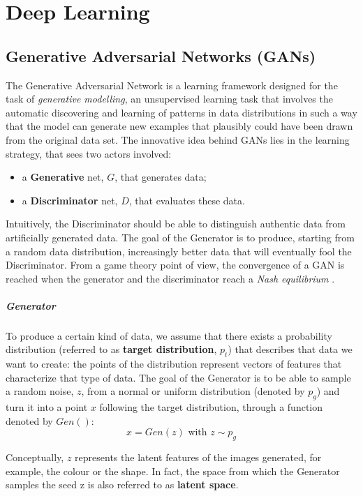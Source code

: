 \documentclass[12pt,a4paper]{book}
\theoremstyle{definition}
\begin{document}
	\chapter{Deep Learning}\label{appendix:dl}
	\section{Generative Adversarial Networks (GANs)}
	The Generative Adversarial Network \cite{Goodfellow2014} is a learning framework designed for the task of \textit{generative modelling}, an unsupervised learning task that involves the automatic discovering and learning of patterns in data distributions in such a way that the model can generate new examples that plausibly could have been drawn from the original data set. The innovative idea behind GANs lies in the learning strategy, that sees two actors involved:
	\begin{itemize}
		\item a \textbf{Generative} net, $G$, that generates data;
		\item a \textbf{Discriminator} net, $D$, that evaluates these data.
	\end{itemize}
	Intuitively, the Discriminator should be able to distinguish authentic data from artificially generated data. The goal of the Generator is to produce, starting from a random data distribution, increasingly better data that will eventually fool the Discriminator. From a game theory point of view, the convergence of a GAN is reached when the generator and the discriminator reach a \textit{Nash equilibrium} \cite{Ratliff2013}.
	\paragraph{Generator}
	To produce a certain kind of data, we assume that there exists a probability distribution (referred to as \textbf{target distribution}, $p_t$) that describes that data we want to create: the points of the distribution represent vectors of features that characterize that type of data. The goal of the Generator is to be able to sample a random noise, $z$, from a normal or uniform distribution (denoted by $p_g$) and turn it into a point $x$  following the target distribution, through a function denoted by $Gen()$:
	\[
	x = Gen(z) \text{ with } z \sim p_g
	\]
	
	Conceptually, $z$ represents the latent features of the images generated, for example, the colour or the shape. In fact, the space from which the Generator samples the seed z is also referred to as \textbf{latent space}.
\end{document}
